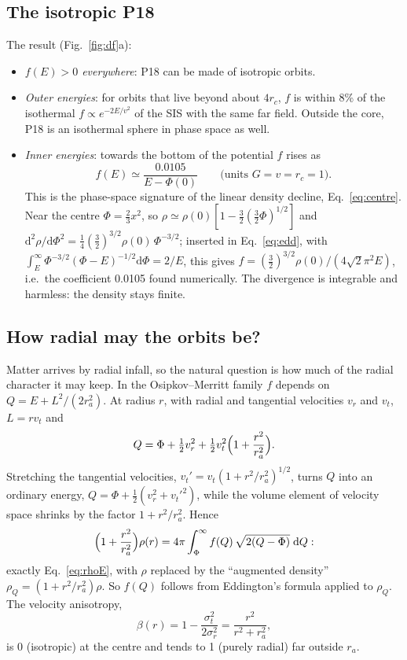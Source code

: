 \documentclass[11pt,a4paper]{article}
\newcommand{\rc}{r_c}
\newcommand{\dd}{\mathrm{d}}
\begin{document}
\subsection{The isotropic P18}\label{sec:iso}
The result (Fig.~\ref{fig:df}a):
\begin{itemize}
\item \emph{$f(E)>0$ everywhere}: P18 can be made of isotropic orbits.
\item \emph{Outer energies}: for orbits that live beyond about $4\rc$, $f$ is within
  8\% of the isothermal $f\propto e^{-2E/v^2}$ of the SIS with the same far field.
  Outside the core, P18 is an isothermal sphere in phase space as well.
\item \emph{Inner energies}: towards the bottom of the potential $f$ rises as
  \begin{equation}
    f(E)\simeq\frac{0.0105}{E-\Phi(0)}\qquad\bigl(\text{units }G=v=\rc=1\bigr).
  \end{equation}
  This is the phase-space signature of the linear density decline,
  Eq.~\eqref{eq:centre}. Near the centre $\Phi=\tfrac23x^2$, so
  $\rho\simeq\rho(0)[1-\tfrac32(\tfrac32\Phi)^{1/2}]$ and
  $\dd^2\rho/\dd\Phi^2=\tfrac14(\tfrac32)^{3/2}\rho(0)\,\Phi^{-3/2}$; inserted in
  Eq.~\eqref{eq:edd}, with $\int_E^\infty\Phi^{-3/2}(\Phi-E)^{-1/2}\dd\Phi=2/E$,
  this gives $f=(\tfrac32)^{3/2}\rho(0)/(4\sqrt2\pi^2E)$, i.e.\ the coefficient
  0.0105 found numerically. The divergence is integrable and harmless: the density
  stays finite.
\end{itemize}

\subsection{How radial may the orbits be?}\label{sec:om}
Matter arrives by radial infall, so the natural question is how much of the radial
character it may keep. In the Osipkov--Merritt family $f$ depends on
$Q=E+L^2/(2r_a^2)$. At radius $r$, with radial and tangential velocities $v_r$ and
$v_t$, $L=rv_t$ and
\begin{equation}
  Q=\Phi+\tfrac12v_r^2+\tfrac12v_t^2\Bigl(1+\frac{r^2}{r_a^2}\Bigr).
\end{equation}
Stretching the tangential velocities, $v_t'=v_t(1+r^2/r_a^2)^{1/2}$, turns $Q$ into
an ordinary energy, $Q=\Phi+\tfrac12(v_r^2+v_t'^2)$, while the volume element of
velocity space shrinks by the factor $1+r^2/r_a^2$. Hence
\begin{equation}
  \Bigl(1+\frac{r^2}{r_a^2}\Bigr)\rho(r)
  =4\pi\int_\Phi^\infty f(Q)\,\sqrt{2(Q-\Phi)}\;\dd Q:
\end{equation}
exactly Eq.~\eqref{eq:rhoE}, with $\rho$ replaced by the ``augmented density''
$\rho_Q=(1+r^2/r_a^2)\rho$. So $f(Q)$ follows from Eddington's formula applied to
$\rho_Q$. The velocity anisotropy,
\begin{equation}
  \beta(r)=1-\frac{\sigma_t^2}{2\sigma_r^2}=\frac{r^2}{r^2+r_a^2},
\end{equation}
is 0 (isotropic) at the centre and tends to 1 (purely radial) far outside $r_a$.
\end{document}
